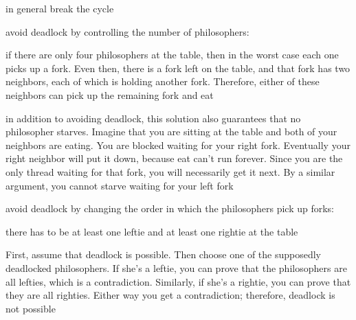 \documentclass[landscape, a4paper]{article}
\begin{document}
\begin{minipage}[t]{0.2\linewidth}
\begin{betterlist}
\begin{betterlist}
		\end{betterlist}
	\end{betterlist}
	\begin{betterlist}
		\item {}
		\begin{betterlist}
			\item in general break the cycle
			\item avoid deadlock by controlling the number of philosophers:
			\begin{betterlist}
				\item if there are only four philosophers at the table, then in the worst case each one picks up a fork. Even then, there is a fork left on the table, and that fork has two neighbors, each of which is holding another fork. Therefore, either of these neighbors can pick up the remaining fork and eat
				\item in addition to avoiding deadlock, this solution also guarantees that no philosopher starves. Imagine that you are sitting at the table and both of your neighbors are eating. You are blocked waiting for your right fork. Eventually your right neighbor will put it down, because eat can’t run forever. Since you are the only thread waiting for that fork, you will necessarily get it next. By a similar argument, you cannot starve waiting for your left fork
			\end{betterlist}
			\item avoid deadlock by changing the order in which the philosophers pick up forks:
			\begin{betterlist}
				\item there has to be at least one leftie and at least one rightie at the table
				\item {} First, assume that deadlock is possible. Then choose one of the supposedly deadlocked philosophers. If she’s a leftie, you can prove that the philosophers are all lefties, which is a contradiction. Similarly, if she’s a rightie, you can prove that they are all righties. Either way you get a contradiction; therefore, deadlock is not possible
			\end{betterlist}
		\end{betterlist}
	\end{betterlist}

\end{minipage}

\newpage
\end{document}
